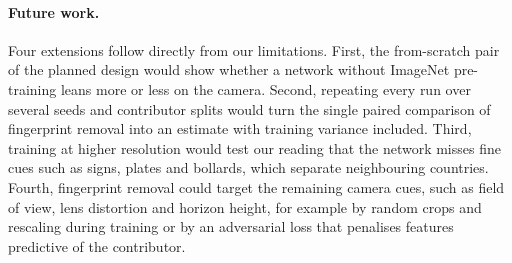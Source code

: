 \documentclass[clean,twocolumn]{bam-project}
\begin{document}
\paragraph{Future work.} Four extensions follow directly from our limitations. First, the from-scratch
pair of the planned design would show whether a network without ImageNet pre-training leans more or less
on the camera. Second, repeating every run over several seeds and contributor splits would turn the
single paired comparison of fingerprint removal into an estimate with training variance included. Third,
training at higher resolution would test our reading that the network misses fine cues such as signs,
plates and bollards, which separate neighbouring countries. Fourth, fingerprint removal could target the
remaining camera cues, such as field of view, lens distortion and horizon height, for example by random
crops and rescaling during training or by an adversarial loss that penalises features predictive of the
contributor.
\end{document}
